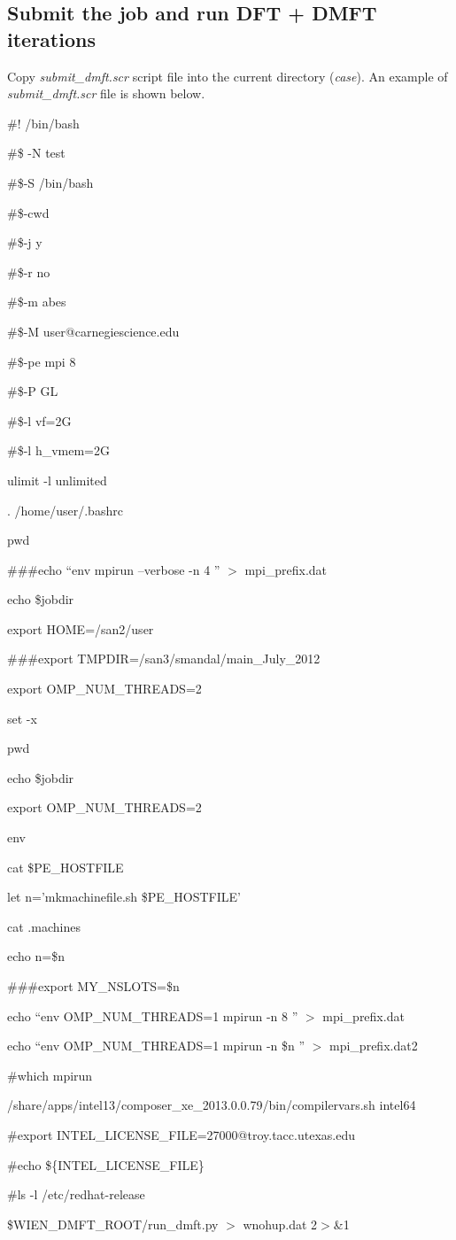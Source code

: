 \documentclass[12 pt]{article}
\begin{document}
      \subsection{Submit the job and run DFT + DMFT iterations}

  Copy \emph{submit\_dmft.scr} script file into the current directory (\emph{case}). An example of 
\emph{submit\_dmft.scr} file is shown below.

  {\color{cyan}
  \#! /bin/bash

  \#\$ -N test

  \#\$-S /bin/bash

  \#\$-cwd

  \#\$-j y

  \#\$-r no

  \#\$-m abes

  \#\$-M user@carnegiescience.edu

  \#\$-pe mpi 8

  \#\$-P GL

  \#\$-l vf=2G

  \#\$-l h\_vmem=2G

  ulimit -l unlimited

  . /home/user/.bashrc

  pwd

  \#\#\#echo ``env mpirun --verbose -n 4 '' $>$ mpi\_prefix.dat

  echo \$jobdir

  export HOME=/san2/user

  \#\#\#export TMPDIR=/san3/smandal/main\_July\_2012

  export OMP\_NUM\_THREADS=2

  set -x

  pwd

  echo \$jobdir

  export OMP\_NUM\_THREADS=2

  env

  cat \$PE\_HOSTFILE

  let n='mkmachinefile.sh \$PE\_HOSTFILE'

  cat .machines

  echo n=\$n

  \#\#\#export MY\_NSLOTS=\$n

  echo ``env OMP\_NUM\_THREADS=1 mpirun -n 8 '' $>$ mpi\_prefix.dat

  echo ``env OMP\_NUM\_THREADS=1 mpirun -n \$n '' $>$ mpi\_prefix.dat2

  \#which mpirun

  /share/apps/intel13/composer\_xe\_2013.0.0.79/bin/compilervars.sh intel64

  \#export INTEL\_LICENSE\_FILE=27000@troy.tacc.utexas.edu

  \#echo \$\{INTEL\_LICENSE\_FILE\}

  \#ls -l /etc/redhat-release

  \$WIEN\_DMFT\_ROOT/run\_dmft.py $>$ wnohup.dat 2$>$\&1
  }
\end{document}
